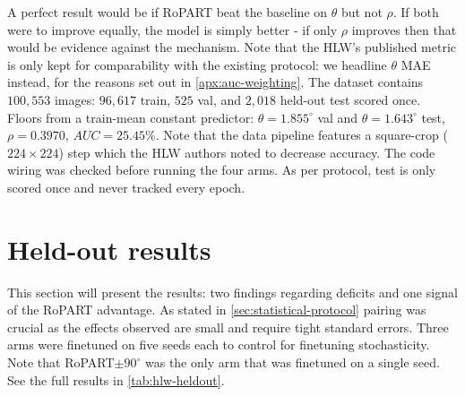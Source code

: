 \documentclass[final_report.tex]{subfiles}
\begin{document}
A perfect result would be if RoPART beat the baseline on $\theta$ but not $\rho$. If both were to improve equally, the model is simply better - if only $\rho$ improves then that would be evidence against the mechanism. Note that the HLW's published metric is only kept for comparability with the existing protocol: we headline $\theta$ MAE instead, for the reasons set out in \cref{apx:auc-weighting}. The dataset contains $100,553$ images: $96,617$ train, $525$ val, and $2,018$ held-out test scored once. Floors from a train-mean constant predictor: $\theta=1.855^\circ$ val and $\theta=1.643^\circ$ test, $\rho=0.3970$, $AUC=25.45\%$. Note that the data pipeline features a square-crop ($224\times 224$) step which the HLW authors noted to decrease accuracy. The code wiring was checked before running the four arms. As per protocol, test is only scored once and never tracked every epoch. 

\section{Held-out results}\label{sec:hlw-results}
This section will present the results: two findings regarding deficits and one signal of the RoPART advantage. As stated in \cref{sec:statistical-protocol} pairing was crucial as the effects observed are small and require tight standard errors. Three arms were finetuned on five seeds each to control for finetuning stochasticity. Note that RoPART$\pm90^\circ$ was the only arm that was finetuned on a single seed. See the full results in \cref{tab:hlw-heldout}.
\end{document}
